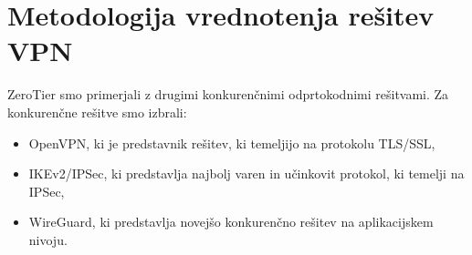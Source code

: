 \documentclass[a4paper, 12pt]{book}
\begin{document}
\chapter{Metodologija vrednotenja rešitev VPN}
\label{methodology}

ZeroTier smo primerjali z drugimi konkurenčnimi odprtokodnimi rešitvami.  Za konkurenčne rešitve smo izbrali:
\begin{itemize}
    \setlength\itemsep{0em}
    \item OpenVPN, ki je predstavnik rešitev, ki temeljijo na protokolu TLS/SSL,
    
    \item IKEv2/IPSec, ki predstavlja najbolj varen in učinkovit protokol, ki temelji na IPSec,
    
    \item WireGuard, ki predstavlja novejšo konkurenčno rešitev na aplikacijskem nivoju.
\end{itemize}
\end{document}
